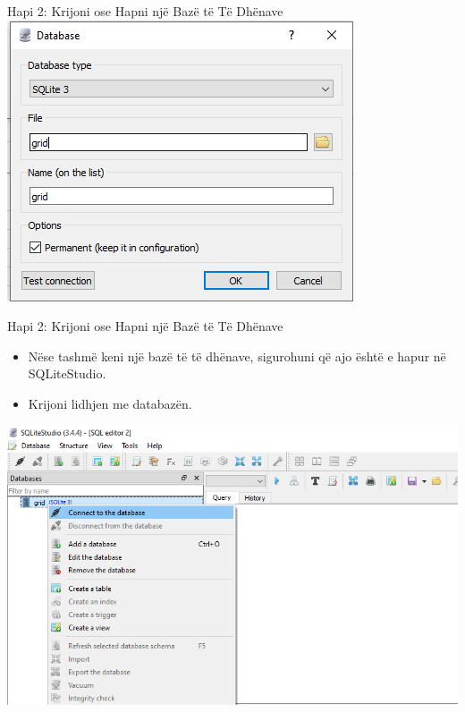 \documentclass[
  ignorenonframetext,
]{beamer}
\begin{document}
\begin{frame}{Hapi 2: Krijoni ose Hapni një Bazë të Të Dhënave}
\label{hapi-2-krijoni-ose-hapni-njuxeb-bazuxeb-tuxeb-tuxeb-dhuxebnave-1}
\includegraphics{./Figs/sql7.png}
\end{frame}

\begin{frame}{Hapi 2: Krijoni ose Hapni një Bazë të Të Dhënave}
\label{hapi-2-krijoni-ose-hapni-njuxeb-bazuxeb-tuxeb-tuxeb-dhuxebnave-2}
\begin{itemize}
\item
  Nëse tashmë keni një bazë të të dhënave, sigurohuni që ajo është e
  hapur në SQLiteStudio.
\item
  Krijoni lidhjen me databazën.
\end{itemize}

\includegraphics{./Figs/sql8.png}
\end{frame}
\end{document}
